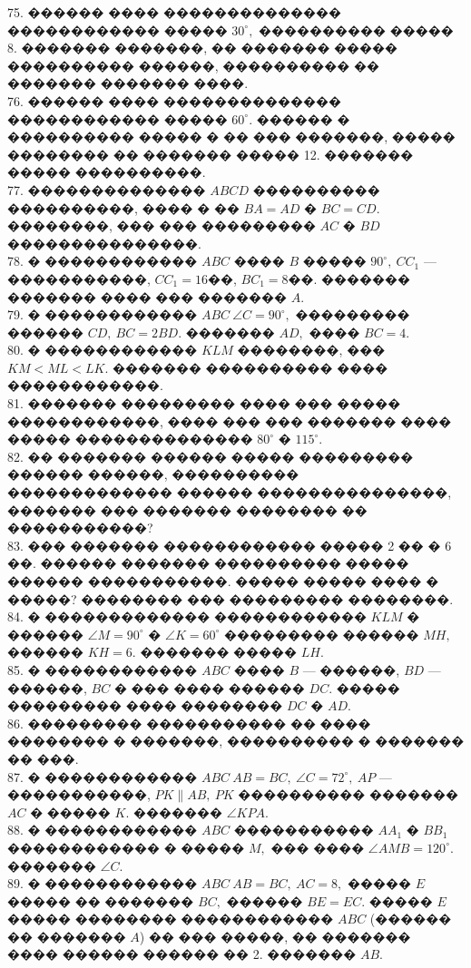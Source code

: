 \documentclass[12pt]{article}
\begin{document}
75. ������ ���� �������������� ������������ ����� $30^\circ,$ ���������� ����� 8. ������� �������, �� ������� ����� ���������� ������, ���������� �� ������� ������� ����.\\
76. ������ ���� �������������� ������������ ����� $60^\circ.$ ������ � ���������� ����� � �� ��� �������, ����� �������� �� ������� ����� 12. ������� ����� ����������.\\
77. �������������� $ABCD$ ���������� ����������, ���� � �� $BA=AD$ � $BC=CD.$ ��������, ��� ��� ��������� $AC$ � $BD$ ���������������.\\
78. � ������������ $ABC$ ���� $B$ ����� $90^\circ,\ CC_1$ --- �����������, $CC_1=16$��, $BC_1=8$��. ������� ������� ���� ��� ������� $A.$\\
79. � ������������ $ABC\ \angle C=90^\circ,$ ��������� ������ $CD,\ BC=2BD.$ ������� $AD,$ ���� $BC=4.$\\
80. � ������������ $KLM$ ��������, ��� $KM<ML<LK.$ ������� ���������� ���� ������������.\\
81. ������� ��������� ���� ��� ����� ������������, ���� ��� ��� ������� ���� ����� �������������� $80^\circ$ � $115^\circ.$\\
82. �� ������� ������ ����� ��������� ������ ������, ���������� ������������� ������ ���������������, ������� ��� ������� �������� �� �����������?\\
83. ��� ������� ������������ ����� 2 �� � 6 ��. ������ ������� ���������� ����� ������ �����������. ����� ����� ���� � �����? �������� ��� ��������� ��������.\\
84. � ������������� ������������ $KLM$ � ������ $\angle M=90^\circ$ � $\angle K=60^\circ$ ��������� ������ $MH,$ ������ $KH=6.$ ������� ����� $LH.$\\
85. � ������������ $ABC$ ���� $B$ --- ������, $BD$ --- ������,  $BC$ � ��� ���� ������ $DC.$ ����� ��������� ���� �������� $DC$ � $AD.$\\
86. ��������� ����������� �� ���� �������� � �������, ���������� � ������� �� ���.\\
87. � ������������ $ABC\ AB=BC,\ \angle C=72^\circ,\ AP$ --- �����������, $PK\parallel AB,\ PK$ ���������� ������� $AC$ � ����� $K.$ ������� $\angle KPA.$\\
88. � ������������ $ABC$ ����������� $AA_1$ � $BB_1$ ������������ � ����� $M,$ ��� ���� $\angle AMB=120^\circ.$ ������� $\angle C.$\\
89. � ������������ $ABC\ AB=BC,\ AC=8,$ ����� $E$ ����� �� ������� $BC,$ ������ $BE=EC.$ ����� $E$ ����� �������� ������������ $ABC$ (������ �� ������� $A$) �� ��� �����, �� ������� ���� ������ ������ �� 2. ������� $AB.$\\
\end{document}
